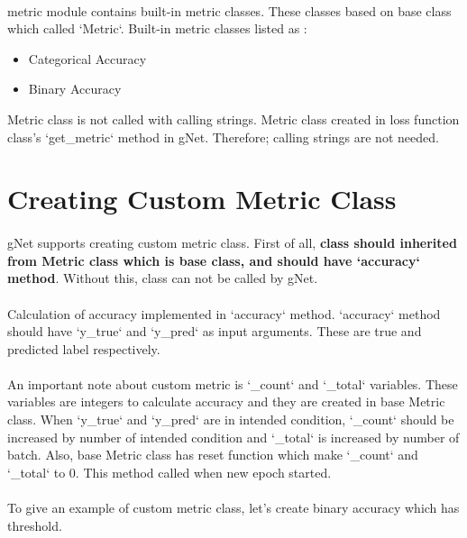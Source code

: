 \documentclass[12pt]{report}
\begin{document}
\paragraph{}
metric module contains built-in metric classes. These classes based on base class which called `Metric`. Built-in metric classes listed as : 

\begin{itemize}
	\item	Categorical Accuracy
	\item	Binary Accuracy
\end{itemize}

Metric class is not called with calling strings. Metric class created in loss function class's `get\_metric` method in gNet. Therefore; calling strings are not needed. 

\section{Creating Custom Metric Class}

\paragraph{}
gNet supports creating custom metric class. First of all, \textbf{class should inherited from Metric class which is base class, and should have `accuracy` method}. Without this, class can not be called by gNet. 

\paragraph{}
Calculation of accuracy implemented in `accuracy` method. `accuracy` method should have `y\_true` and `y\_pred` as input arguments. These are true and predicted label respectively. 

\paragraph{}
An important note about custom metric is `\_count` and `\_total` variables. These variables are integers to calculate accuracy and they are created in base Metric class. When `y\_true` and `y\_pred` are in intended condition, `\_count` should be increased by number of intended condition and `\_total` is increased by number of batch. Also, base Metric class has reset function which make `\_count` and `\_total` to 0. This method called when new epoch started. 


\paragraph{}
To give an example of custom metric class, let's create binary accuracy which has threshold.
\end{document}
